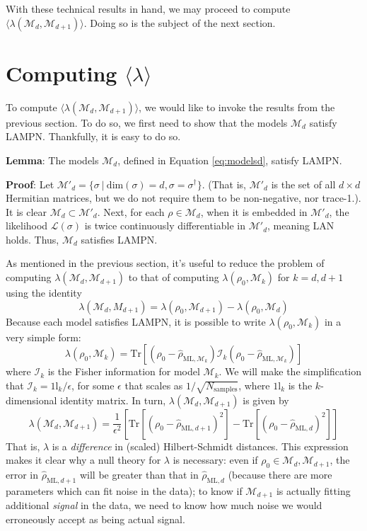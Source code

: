 \documentclass[aps,pra, twocolumn]{revtex4-1}
\newcommand{\M}{\mathcal{M}}
\newcommand{\cL}{\mathcal{L}}
\newcommand{\Id}{\mathbb{I}}
\def\Id{1\!\mathrm{l}}
\newcommand{\rhohat}{\hat{\rho}}
\newcommand{\rhoML}[1]{\rhohat_{\scriptscriptstyle{\mathrm{ML},#1}}}
\begin{document}
With these technical results in hand, we may proceed to compute $\langle \lambda(\M_{d}, \M_{d+1})\rangle$. Doing so is the subject of the next section.

\section{Computing $\langle \lambda \rangle$}
\label{sec:computingllrs}

To compute $\langle \lambda(\M_{d}, \M_{d+1}) \rangle$, we would like to invoke the results from the previous section. To do so, we first need to show that the models $\M_{d}$ satisfy LAMPN. Thankfully, it is easy to do so.

\textbf{Lemma}: The models $\M_{d}$, defined in Equation \eqref{eq:modelsd}, satisfy LAMPN.

\textbf{Proof}: Let $\M'_{d} = \{\sigma ~|~\mathrm{dim}(\sigma) = d, \sigma = \sigma^{\dagger}\}$. (That is, $\M'_{d}$ is the set of all $d \times d$ Hermitian matrices, but we do not require them to be non-negative, nor trace-1.). It is clear $\M_{d} \subset \M'_{d}$. Next, for each $\rho \in \M_{d}$, when it is embedded in $\M'_{d}$, the likelihood $\cL(\sigma)$ is twice continuously differentiable in $\M'_{d}$, meaning LAN holds. Thus, $\M_{d}$ satisfies LAMPN.

As mentioned in the previous section, it's useful to reduce the problem of computing $\lambda(\M_{d}, \M_{d+1})$ to that of computing $\lambda(\rho_{0}, \M_{k})$ for $k = d, d+1$ using the identity
\[\lambda(\M_{d}, M_{d+1}) = \lambda(\rho_{0}, \M_{d+1}) - \lambda(\rho_{0}, \M_{d})\]
Because each model satisfies LAMPN, it is possible to write $\lambda(\rho_{0}, \M_{k})$ in a very simple form:
\[\lambda(\rho_{0}, \M_{k}) = \mathrm{Tr}[(\rho_{0} - \rhoML{\M_{k}})\mathcal{I}_{k}(\rho_{0} - \rhoML{\M_{k}})]\]
where $\mathcal{I}_{k}$ is the Fisher information for model $\M_{k}$. We will make the simplification that $\mathcal{I}_{k} = \Id_{k}/\epsilon $, for some $\epsilon$ that scales as $1/\sqrt{N_{\mathrm{samples}}}$, where $\Id_{k}$ is the $k$-dimensional identity matrix. In turn, $\lambda(\M_{d},\M_{d+1})$ is given by
\begin{equation}
\lambda(\M_{d}, \M_{d+1}) = \frac{1}{\epsilon^{2}}\left[\mathrm{Tr}[(\rho_{0} - \rhoML{d+1})^{2}] -  \mathrm{Tr}[(\rho_{0} - \rhoML{d})^{2}]\right]
\end{equation}
That is, $\lambda$ is a \emph{difference} in (scaled) Hilbert-Schmidt distances. This expression makes it clear why a null theory for $\lambda$ is necessary: even if $\rho_{0} \in \M_{d},\M_{d+1}$, the error in $\rhoML{d+1}$ will be greater than that in $\rhoML{d}$ (because there are more parameters which can fit noise in the data); to know if $\M_{d+1}$ is actually fitting additional \emph{signal} in the data, we need to know how much noise we would erroneously accept as being actual signal.
\end{document}
